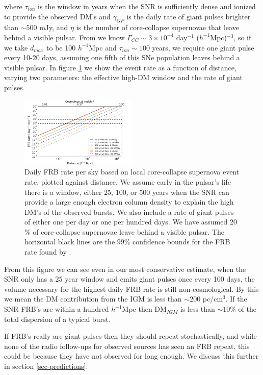 \documentclass[useAMS,usenatbib]{mn2e}
\begin{document}
\noindent where $\tau_{ion}$ is the window in years when the SNR is sufficiently
dense and ionized to provide the observed DM's and $\gamma_{GP}$
is the daily rate of giant pulses brighter than $\sim 500$ mJy, and $\eta$
is the number of core-collapse supernovae that leave behind a visible pulsar. 
From \cite{2014ApJ...792..135T} we know  
$\Gamma_{CC}\sim3 \times 10^{-4}$ day$^{-1}$ ($h^{-1}$Mpc)$^{-3}$,
so if we take $d_{max}$ to be 100 $h^{-1}$Mpc and $\tau_{ion}\sim100$ years,
we require one giant pulse every 10-20 days, assuming one fifth of this SNe population
leaves behind a visible pulsar.
In figure \ref{FIG-RATE} 
we show the event rate as a function of distance, varying two parameters: the 
effective high-DM window and the rate of giant pulses. 

\begin{figure}
\label{FIG-RATE}
  \centering
   \includegraphics[width=0.5\textwidth]{FRB_SNR_rate.png}
   \caption{Daily FRB rate per sky based on local core-collapse supernova 
   event rate, plotted against distance.
   We assume early in the pulsar's life there is a window, either 
   25, 100, or 500 years when the SNR can provide a large enough electron 
   column density to explain the high DM's of the observed bursts. We also
   include a rate of giant pulses of either one per day or one per hundred
   days. We have assumed 20$\%$ of core-collapse supernovae leave behind
   a visible pulsar.
   The horizontal black lines are the $99\%$ confidence bounds for the FRB rate
   found by \protect\cite{2015arXiv150500834R}.}
\end{figure}

From this figure we can see even in our most conservative estimate, when
the SNR only has a 25 year window and emits giant pulses once every
100 days, the volume necessary for the highest daily FRB rate is still non-cosmological.
By this we mean the DM contribution from the IGM is less than $\sim 200$ pc/cm$^3$.
If the SNR FRB's are within a hundred $h^{-1}$Mpc then DM$_{IGM}$ is less than 
$\sim 10 \%$  of the total dispersion of a typical burst.

If FRB's really are giant pulses then they 
should repeat stochastically, and while none of the radio follow-ups for
observed sources has seen an FRB repeat, this could be because they
have not observed for long enough. We discuss this further in section 
\ref{sec-predictions}.
\end{document}
